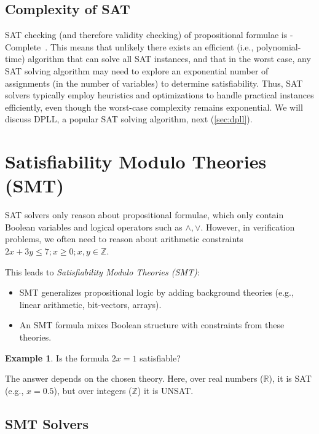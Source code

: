 \documentclass[oneside,11pt,dvipsnames]{book}
\numberwithin{equation}{section}
\theoremstyle{definition}
\newtheorem{example}{Example}[section]
\theoremstyle{remark}
\begin{document}
\subsection{Complexity of SAT}\label{sec:complexity-sat}

SAT checking (and therefore validity checking) of propositional formulae is \NP-Complete~\cite{cook2023complexity,karp2009reducibility}.
This means that unlikely there exists an efficient (i.e., polynomial-time) algorithm that can solve all SAT instances, and that in the worst case, any SAT solving algorithm may need to explore an exponential number of assignments (in the number of variables) to determine satisfiability. Thus, SAT solvers typically employ heuristics and optimizations to handle practical instances efficiently, even though the worst-case complexity remains exponential. We will discuss DPLL, a popular SAT solving algorithm, next (\autoref{sec:dpll}).

\section{Satisfiability Modulo Theories (SMT)}\label{chap:smt}

SAT solvers only reason about propositional formulae, which only contain Boolean variables and logical operators such as $\land, \lor$.  However, in verification problems, we often need to reason about arithmetic constraints $2x + 3y \leq 7; x \geq 0; x,y \in \mathbb{Z}$.


This leads to \emph{Satisfiability Modulo Theories (SMT)}:
\begin{itemize}
  \item SMT generalizes propositional logic by adding background theories (e.g., linear arithmetic, bit-vectors, arrays).
  \item An SMT formula mixes Boolean structure with constraints from these theories.
\end{itemize}

\begin{example}\label{ex:smt2}
Is the formula $2x = 1$ satisfiable?

The answer depends on the chosen theory. Here, over real numbers ($\mathbb{R}$), it is SAT (e.g., $x=0.5$), but over integers ($\mathbb{Z}$) it is UNSAT.

\end{example}
\subsection{SMT Solvers}\label{sec:smt-solvers}
\end{document}

